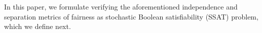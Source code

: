 
%
%
%
%
%
%
%
%

In this paper, we formulate verifying the aforementioned independence and separation metrics of fairness as stochastic Boolean satisfiability (SSAT) problem, which we define next. 

